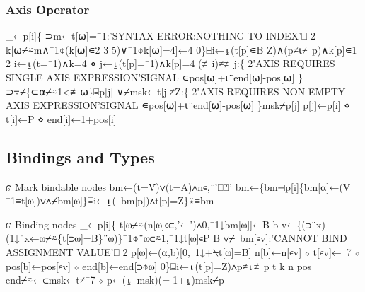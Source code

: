 \documentclass{article}%
\begin{document}
\subsubsection{Axis Operator}

\nwenddocs{}\endmoddef\nwstartdeflinemarkup{}\nwenddeflinemarkup
_←p[i]\{
        ⊃m←t[⍵]=¯1:'SYNTAX ERROR:NOTHING TO INDEX'⎕ 2
        k[⍵⌿⍨m∧¯1⌽(k[⍵]∊2 3 5)∨¯1⌽k[⍵]=4]←4
0\}⌸i←⍸(t[p]∊B Z)∧(p≠⍳≢p)∧k[p]∊1 2
i←⍸(t=¯1)∧k=4 ⋄ j←⍸(t[p]=¯1)∧k[p]=4
(≢i)≠≢j:\{
        2'AXIS REQUIRES SINGLE AXIS EXPRESSION'SIGNAL ∊pos[⍵]+⍳¨end[⍵]-pos[⍵]
\}⊃⍪⌿\{⊂⍺⌿⍨1<≢⍵\}⌸p[j]
∨⌿msk←t[j]≠Z:\{
        2'AXIS REQUIRES NON-EMPTY AXIS EXPRESSION'SIGNAL ∊pos[⍵]+⍳¨end[⍵]-pos[⍵]
\}msk⌿p[j]
p[j]←p[i] ⋄ t[i]←P ⋄ end[i]←1+pos[i]
\nwendcode{}\nwdocspar

\subsection{Bindings and Types}

\nwenddocs{}\endmoddef\nwstartdeflinemarkup{}\nwenddeflinemarkup
⍝ Mark bindable nodes
bm←(t=V)∨(t=A)∧n∊,¨'⎕⍞'
bm←\{bm⊣p[i]\{bm[⍺]←(V ¯1≡t[⍵])∨∧⌿bm[⍵]\}⌸i←⍸(~bm[p])∧t[p]=Z\}⍣≡bm

⍝ Binding nodes
_←p[i]\{
        t[⍵⌿⍨(n[⍵]∊⊂,'←')∧0,¯1↓bm[⍵]]←B
        b v←\{(⊃¨x)(1↓¨x←⍵⌿⍨\{t[⊃⍵]=B\}¨⍵)\}¯1⌽¨⍵⊂⍨1,¯1↓t[⍵]∊P B
        ∨⌿~bm[∊v]:'CANNOT BIND ASSIGNMENT VALUE'⎕ 2
        p[⍵]←(⍺,b)[0,¯1↓+⍀t[⍵]=B]
        n[b]←n[∊v] ⋄ t[∊v]←¯7 ⋄ pos[b]←pos[∊v] ⋄ end[b]←end[⊃⌽⍵]
0\}⌸i←⍸(t[p]=Z)∧p≠⍳≢p
t k n pos end⌿⍨←⊂msk←t≠¯7 ⋄ p←(⍸~msk)(⊢-1+⍸)msk⌿p
\nwendcode{}\nwdocspar
\end{document}
